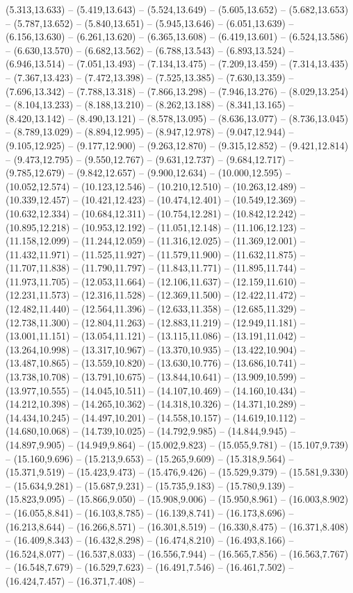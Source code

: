 (5.313,13.633) -- (5.419,13.643) -- (5.524,13.649) -- (5.605,13.652) -- (5.682,13.653) -- (5.787,13.652) -- (5.840,13.651) -- (5.945,13.646) -- (6.051,13.639) -- (6.156,13.630) -- (6.261,13.620) -- (6.365,13.608) -- (6.419,13.601) -- (6.524,13.586) -- (6.630,13.570) -- (6.682,13.562) -- (6.788,13.543) -- (6.893,13.524) -- (6.946,13.514) -- (7.051,13.493) -- (7.134,13.475) -- (7.209,13.459) -- (7.314,13.435) -- (7.367,13.423) -- (7.472,13.398) -- (7.525,13.385) -- (7.630,13.359) -- (7.696,13.342) -- (7.788,13.318) -- (7.866,13.298) -- (7.946,13.276) -- (8.029,13.254) -- (8.104,13.233) -- (8.188,13.210) -- (8.262,13.188) -- (8.341,13.165) -- (8.420,13.142) -- (8.490,13.121) -- (8.578,13.095) -- (8.636,13.077) -- (8.736,13.045) -- (8.789,13.029) -- (8.894,12.995) -- (8.947,12.978) -- (9.047,12.944) -- (9.105,12.925) -- (9.177,12.900) -- (9.263,12.870) -- (9.315,12.852) -- (9.421,12.814) -- (9.473,12.795) -- (9.550,12.767) -- (9.631,12.737) -- (9.684,12.717) -- (9.785,12.679) -- (9.842,12.657) -- (9.900,12.634) -- (10.000,12.595) -- (10.052,12.574) -- (10.123,12.546) -- (10.210,12.510) -- (10.263,12.489) -- (10.339,12.457) -- (10.421,12.423) -- (10.474,12.401) -- (10.549,12.369) -- (10.632,12.334) -- (10.684,12.311) -- (10.754,12.281) -- (10.842,12.242) -- (10.895,12.218) -- (10.953,12.192) -- (11.051,12.148) -- (11.106,12.123) -- (11.158,12.099) -- (11.244,12.059) -- (11.316,12.025) -- (11.369,12.001) -- (11.432,11.971) -- (11.525,11.927) -- (11.579,11.900) -- (11.632,11.875) -- (11.707,11.838) -- (11.790,11.797) -- (11.843,11.771) -- (11.895,11.744) -- (11.973,11.705) -- (12.053,11.664) -- (12.106,11.637) -- (12.159,11.610) -- (12.231,11.573) -- (12.316,11.528) -- (12.369,11.500) -- (12.422,11.472) -- (12.482,11.440) -- (12.564,11.396) -- (12.633,11.358) -- (12.685,11.329) -- (12.738,11.300) -- (12.804,11.263) -- (12.883,11.219) -- (12.949,11.181) -- (13.001,11.151) -- (13.054,11.121) -- (13.115,11.086) -- (13.191,11.042) -- (13.264,10.998) -- (13.317,10.967) -- (13.370,10.935) -- (13.422,10.904) -- (13.487,10.865) -- (13.559,10.820) -- (13.630,10.776) -- (13.686,10.741) -- (13.738,10.708) -- (13.791,10.675) -- (13.844,10.641) -- (13.909,10.599) -- (13.977,10.555) -- (14.045,10.511) -- (14.107,10.469) -- (14.160,10.434) -- (14.212,10.398) -- (14.265,10.362) -- (14.318,10.326) -- (14.371,10.289) -- (14.434,10.245) -- (14.497,10.201) -- (14.558,10.157) -- (14.619,10.112) -- (14.680,10.068) -- (14.739,10.025) -- (14.792,9.985) -- (14.844,9.945) -- (14.897,9.905) -- (14.949,9.864) -- (15.002,9.823) -- (15.055,9.781) -- (15.107,9.739) -- (15.160,9.696) -- (15.213,9.653) -- (15.265,9.609) -- (15.318,9.564) -- (15.371,9.519) -- (15.423,9.473) -- (15.476,9.426) -- (15.529,9.379) -- (15.581,9.330) -- (15.634,9.281) -- (15.687,9.231) -- (15.735,9.183) -- (15.780,9.139) -- (15.823,9.095) -- (15.866,9.050) -- (15.908,9.006) -- (15.950,8.961) -- (16.003,8.902) -- (16.055,8.841) -- (16.103,8.785) -- (16.139,8.741) -- (16.173,8.696) -- (16.213,8.644) -- (16.266,8.571) -- (16.301,8.519) -- (16.330,8.475) -- (16.371,8.408) -- (16.409,8.343) -- (16.432,8.298) -- (16.474,8.210) -- (16.493,8.166) -- (16.524,8.077) -- (16.537,8.033) -- (16.556,7.944) -- (16.565,7.856) -- (16.563,7.767) -- (16.548,7.679) -- (16.529,7.623) -- (16.491,7.546) -- (16.461,7.502) -- (16.424,7.457) -- (16.371,7.408) -- 